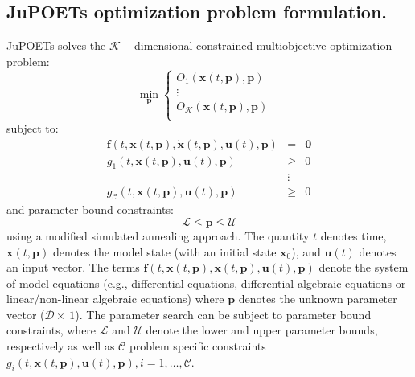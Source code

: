 \documentclass{bmcart}
\begin{document}
\subsection*{JuPOETs optimization problem formulation.}
JuPOETs solves the $\mathcal{K}-$dimensional constrained multiobjective optimization problem:
\begin{equation}
\min_{\mathbf{p}}
\begin{cases}
  O_{1}\left(\mathbf{x}(t,\mathbf{p}),\mathbf{p}\right) \\
  \vdots & \\
  O_{\mathcal{K}}\left(\mathbf{x}(t,\mathbf{p}),\mathbf{p}\right) \\
\end{cases}
\end{equation}
subject to:
\begin{eqnarray}\nonumber
  \mathbf{f}(t,\mathbf{x}(t,\mathbf{p}),\dot{\mathbf{x}}(t,\mathbf{p}),\mathbf{u}(t),\mathbf{p}) &=&\mathbf{0} \\\nonumber
  g_{1}\left(t,\mathbf{x}(t,\mathbf{p}),\mathbf{u}(t),\mathbf{p}\right) &\geq& 0 \\\nonumber
  &\vdots& \\\nonumber
  g_{\mathcal{C}}\left(t,\mathbf{x}(t,\mathbf{p}),\mathbf{u}(t),\mathbf{p}\right) &\geq& 0
\end{eqnarray}and parameter bound constraints:
\begin{equation}\nonumber
  \mathcal{L} \leq \mathbf{p} \leq \mathcal{U}
\end{equation}using a modified simulated annealing approach.
The quantity $t$ denotes time, $\mathbf{x}\left(t,\mathbf{p}\right)$ denotes the model state (with an initial state $\mathbf{x}_{0}$), and $\mathbf{u}(t)$ denotes an input vector.
The terms $\mathbf{f}(t,\mathbf{x}(t,\mathbf{p}),\dot{\mathbf{x}}(t,\mathbf{p}),\mathbf{u}(t),\mathbf{p})$ denote the system of model equations (e.g., differential equations,
differential algebraic equations or linear/non-linear algebraic equations) where $\mathbf{p}$ denotes the unknown parameter vector ($\mathcal{D}\times~1$).
The parameter search can be subject to parameter bound constraints, where $\mathcal{L}$ and $\mathcal{U}$ denote the lower and upper parameter bounds, respectively
as well as $\mathcal{C}$ problem specific constraints $g_i\left(t,\mathbf{x}(t,\mathbf{p}),\mathbf{u}(t),\mathbf{p}\right),i=1,\hdots,\mathcal{C}$.
\end{document}

